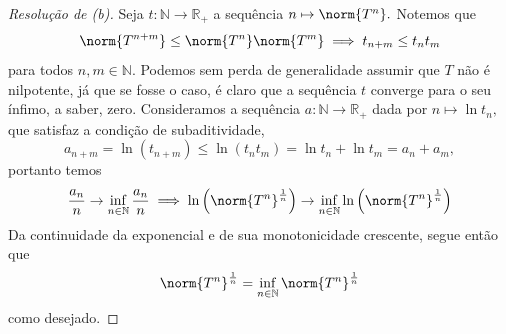\begin{proof}[Resolução de (b)]
  Seja \(t : \mathbb{N} \to \mathbb{R}_+\) a sequência \(n \mapsto \norm{T^n}.\) Notemos que
  \begin{equation*}
    \norm{T^{n + m}} \leq \norm{T^n} \norm{T^m} \implies t_{n+m} \leq t_n t_m
  \end{equation*}
  para todos \(n, m \in \mathbb{N}.\) Podemos sem perda de generalidade assumir que \(T\) não é nilpotente, já que se fosse o caso, é claro que a sequência \(t\) converge para o seu ínfimo, a saber, zero. Consideramos a sequência \(a : \mathbb{N} \to \mathbb{R}_+\) dada por \(n \mapsto \ln t_n,\) que satisfaz a condição de subaditividade,
  \begin{equation*}
    a_{n + m} = \ln(t_{n+m}) \leq \ln(t_n t_m) = \ln t_n + \ln t_m = a_n + a_m,
  \end{equation*}
  portanto temos
  \begin{equation*}
    \frac{a_n}{n} \to \inf_{n \in \mathbb{N}}{\frac{a_n}{n}} \implies \ln\left(\norm{T^n}^{\frac1n}\right) \to \inf_{n\in \mathbb{N}}{\ln\left(\norm{T^n}^{\frac1n}\right)}
  \end{equation*}
  Da continuidade da exponencial e de sua monotonicidade crescente, segue então que
  \begin{equation*}
    \norm{T^n}^{\frac{1}{n}} = \inf_{n \in \mathbb{N}}{\norm{T^n}^{\frac1n}}
  \end{equation*}
  como desejado.
\end{proof}

